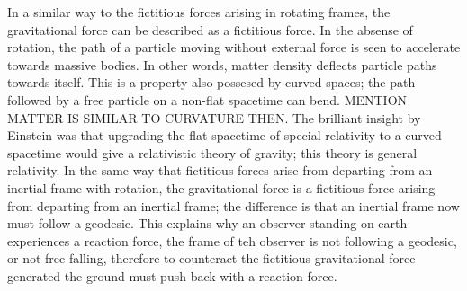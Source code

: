 In a similar way to the fictitious forces arising in rotating frames, the gravitational force can be described as a fictitious force. In the absense of rotation, the path of a particle moving without external force is seen to accelerate towards massive bodies. In other words, matter density deflects particle paths towards itself. This is a property also possesed by curved spaces; the path followed by a free particle on a non-flat spacetime can bend. MENTION MATTER IS SIMILAR TO CURVATURE THEN. The brilliant insight by Einstein was that upgrading the flat spacetime of special relativity to a curved spacetime would give a relativistic theory of gravity; this theory is general relativity. In the same way that fictitious forces arise from departing from an inertial frame with rotation, the gravitational force is a fictitious force arising from departing from an inertial frame; the difference is that an inertial frame now must follow a geodesic. This explains why an observer standing on earth experiences a reaction force, the frame of teh observer is not following a geodesic, or not free falling, therefore to counteract the fictitious gravitational force generated the ground must push back with a reaction force.

